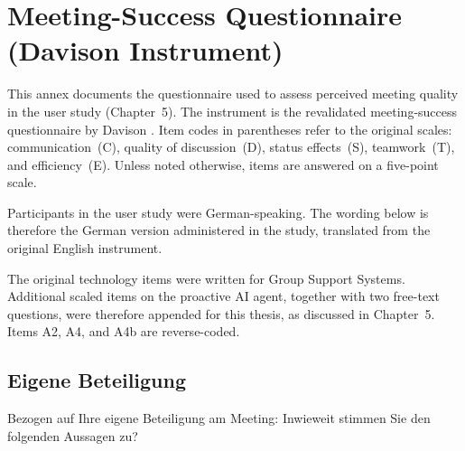 \section{Meeting-Success Questionnaire (Davison Instrument)}
\label{annex:davison-questionnaire}

This annex documents the questionnaire used to assess perceived meeting quality in the
user study (Chapter~5).
The instrument is the revalidated meeting-success questionnaire by Davison
\cite{davisonInstrumentMeasuringMeeting1999}.
Item codes in parentheses refer to the original scales:
communication~(C), quality of discussion~(D), status effects~(S),
teamwork~(T), and efficiency~(E).
Unless noted otherwise, items are answered on a five-point scale.

Participants in the user study were German-speaking.
The wording below is therefore the German version administered in the study,
translated from the original English instrument.

The original technology items were written for Group Support Systems.
Additional scaled items on the proactive AI agent, together with two
free-text questions, were therefore appended for this thesis, as discussed
in Chapter~5.
Items A2, A4, and A4b are reverse-coded.

\newcommand{\qbox}{\fbox{\rule{0pt}{1.05ex}\hspace{1.05ex}}}
\newcommand{\qboxes}{\qbox\ \qbox\ \qbox\ \qbox\ \qbox}
\newcommand{\qscale}[2]{%
  {\small #1 \enspace \qboxes{} \enspace #2}%
}
\newcommand{\qitem}[2]{%
  \par\addvspace{0.85em}%
  \noindent #2\hfill~(#1)\\[0.3em]%
}
\newcommand{\qfreelines}{%
  \par\vspace{0.15em}%
  \noindent\rule{\linewidth}{0.4pt}\\[1.15em]%
  \noindent\rule{\linewidth}{0.4pt}\\[1.15em]%
  \noindent\rule{\linewidth}{0.4pt}\\[1.15em]%
  \noindent\rule{\linewidth}{0.4pt}%
}

\begingroup
\small

\subsection*{Eigene Beteiligung}

\noindent
Bezogen auf Ihre eigene Beteiligung am Meeting: Inwieweit stimmen Sie den
folgenden Aussagen zu?

